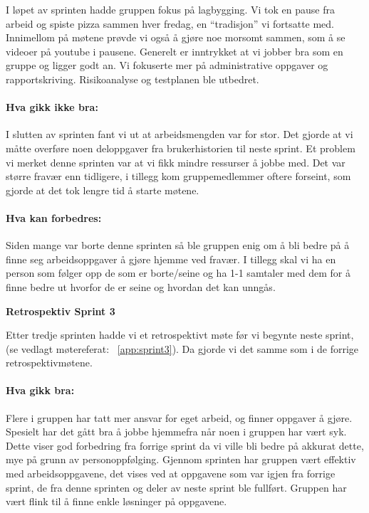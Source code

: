 \documentclass[12pt,a4paper,norsk]{article}
\begin{document}
I løpet av sprinten hadde gruppen fokus på lagbygging. Vi tok en pause fra arbeid og spiste pizza sammen hver fredag, en “tradisjon” vi fortsatte med. Innimellom på møtene prøvde vi også å gjøre noe morsomt sammen, som å se videoer på youtube i pausene.
Generelt er inntrykket at vi jobber bra som en gruppe og ligger godt an.
Vi fokuserte mer på administrative oppgaver og rapportskriving. Risikoanalyse og testplanen ble utbedret.

\paragraph{Hva gikk ikke bra:}
I slutten av sprinten fant vi ut at arbeidsmengden var for stor. Det gjorde at vi måtte overføre noen deloppgaver fra brukerhistorien til neste sprint.
Et problem vi merket denne sprinten var at vi fikk mindre ressurser å jobbe med. Det var større fravær enn tidligere, i tillegg kom gruppemedlemmer oftere forseint, som gjorde at det tok lengre tid å starte møtene.

\paragraph{Hva kan forbedres:}
Siden mange var borte denne sprinten så ble gruppen enig om å bli bedre på å finne seg arbeidsoppgaver å gjøre hjemme ved fravær.
I tillegg skal vi ha en person som følger opp de som er borte/seine og ha 1-1 samtaler med dem for å finne bedre ut hvorfor de er seine og hvordan det kan unngås.


\bigskip \noindent \textbf{Retrospektiv Sprint 3}
\par Etter tredje sprinten hadde vi et retrospektivt møte før vi begynte neste sprint, (se vedlagt møtereferat: ~\cref{app:sprint3}). Da gjorde vi det samme som i de forrige retrospektivmøtene.

\paragraph{Hva gikk bra:}
Flere i gruppen har tatt mer ansvar for eget arbeid, og finner oppgaver å gjøre. Spesielt har det gått bra å jobbe hjemmefra når noen i gruppen har vært syk. Dette viser god forbedring fra forrige sprint da vi ville bli bedre på akkurat dette, mye på grunn av personoppfølging.
Gjennom sprinten har gruppen vært effektiv med arbeidsoppgavene, det vises ved at oppgavene som var igjen fra forrige sprint, de fra denne sprinten og deler av neste sprint ble fullført. Gruppen har vært flink til å finne enkle løsninger på oppgavene.
\end{document}
